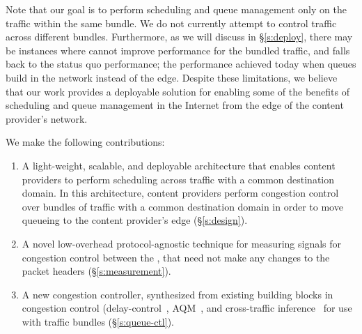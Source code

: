 Note that our goal is to perform scheduling and queue management only on the traffic within the same bundle. We do not currently attempt to control traffic across different bundles. 
Furthermore, as we will discuss in \S\ref{s:deploy}, there may be instances where \name cannot improve performance for the bundled traffic, and falls back to the status quo performance; \ie the performance achieved today when queues build in the network instead of the edge. 
Despite these limitations, we believe that our work provides a deployable solution for enabling some of the benefits of scheduling and queue management in the Internet from the edge of the content provider's network.
 
We make the following contributions:
\begin{enumerate}
    \item A light-weight, scalable, and deployable architecture that enables content providers to perform scheduling across traffic with a common destination domain. In this architecture, content providers perform congestion control over bundles of traffic with a common destination domain in order to move queueing to the content provider's edge (\S\ref{s:design}).
     \item A novel low-overhead protocol-agnostic technique for measuring signals for congestion control between the \pair, that need not make any changes to the packet headers (\S\ref{s:measurement}).
     \item A new congestion controller, synthesized from existing building blocks in congestion control (delay-control~\cite{copa}, AQM~\cite{pie}, and cross-traffic inference~\cite{nimbus} for use with traffic bundles (\S\ref{s:queue-ctl}).
\end{enumerate}
